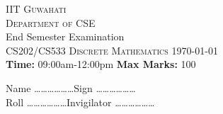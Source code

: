 
\begin{center}

{\textsc{\LARGE IIT Guwahati}}\\[5pt]
{\textsc{\Large Department of CSE}}\\[5pt]
{\LARGE End Semester Examination}\\[20pt]

\textsc{\Large CS202/CS533 Discrete Mathematics} \hfill \textsc{\Large \today} \\[5pt]
{\bf Time:} 09:00am-12:00pm \hfill {\bf Max Marks:} 100\\ 
\end{center}

\noindent
Name \ldots\ldots\ldots\ldots\ldots\ldots \hfill  Sign \ldots\ldots\ldots\ldots\ldots\ldots  \\[5pt] 
Roll \ldots\ldots\ldots\ldots\ldots\ldots \hfill  Invigilator \ldots\ldots\ldots\ldots\ldots\ldots \\[5pt]




\vspace{1ex}

